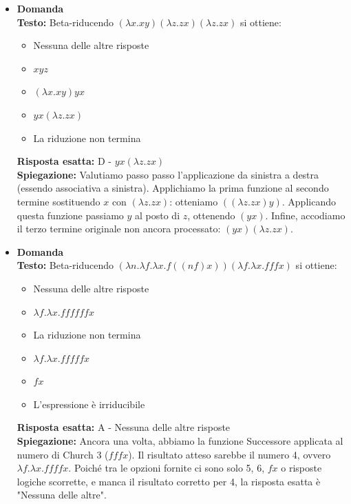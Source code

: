 \documentclass[12pt, a4paper]{article}
\newcounter{domandateoria}
\begin{document}
\begin{itemize}
    \item {}\textbf{Domanda \thedomandateoria} \\
    \textbf{Testo:} Beta-riducendo $(\lambda x.x y)(\lambda z.z x)(\lambda z.z x)$ si ottiene:
    \begin{itemize}
        \item[A)] Nessuna delle altre risposte
        \item[B)] $x y z$
        \item[C)] $(\lambda x.x y) y x$
        \item[D)] $y x(\lambda z.z x)$
        \item[E)] La riduzione non termina
    \end{itemize}
    \textbf{Risposta esatta:} D - $y x(\lambda z.z x)$ \\
    \textbf{Spiegazione:} Valutiamo passo passo l'applicazione da sinistra a destra (essendo associativa a sinistra). Applichiamo la prima funzione al secondo termine sostituendo $x$ con $(\lambda z.z x)$: otteniamo $((\lambda z.z x) y)$. Applicando questa funzione passiamo $y$ al posto di $z$, ottenendo $(y x)$. Infine, accodiamo il terzo termine originale non ancora processato: $(y x)(\lambda z.z x)$.
    \vspace{0.3cm}

    \item {}\textbf{Domanda \thedomandateoria} \\
    \textbf{Testo:} Beta-riducendo $(\lambda n.\lambda f.\lambda x.f((n f)x))(\lambda f.\lambda x.f f f x)$ si ottiene:
    \begin{itemize}
        \item[A)] Nessuna delle altre risposte
        \item[B)] $\lambda f.\lambda x.f f f f f f x$
        \item[C)] La riduzione non termina
        \item[D)] $\lambda f.\lambda x.f f f f f x$
        \item[E)] $f x$
        \item[F)] L'espressione è irriducibile
    \end{itemize}
    \textbf{Risposta esatta:} A - Nessuna delle altre risposte \\
    \textbf{Spiegazione:} Ancora una volta, abbiamo la funzione Successore applicata al numero di Church 3 ($f f f x$). Il risultato atteso sarebbe il numero 4, ovvero $\lambda f.\lambda x.f f f f x$. Poiché tra le opzioni fornite ci sono solo 5, 6, $f x$ o risposte logiche scorrette, e manca il risultato corretto per 4, la risposta esatta è "Nessuna delle altre".
    \vspace{0.3cm}


\end{itemize}
\end{document}
